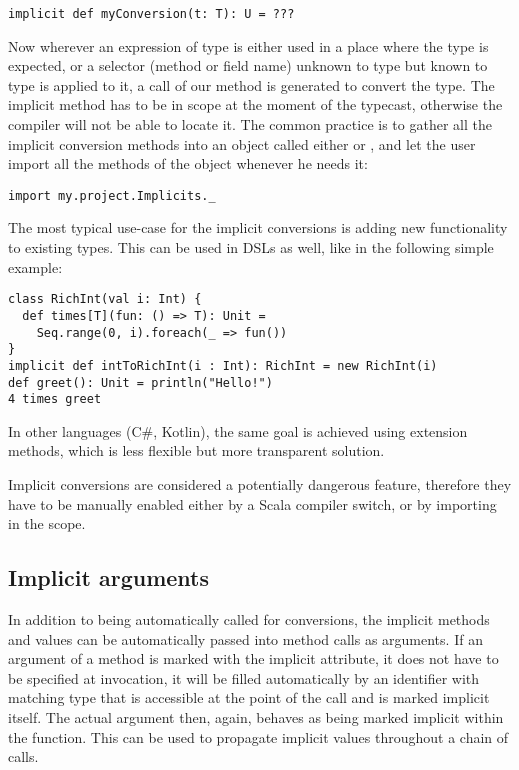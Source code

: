 \lstset{style=Scala}
\begin{lstlisting}
implicit def myConversion(t: T): U = ???
\end{lstlisting}

Now wherever an expression of type  is either used in a place where the type  is expected, or a selector (method or field name) unknown to type  but known to type  is applied to it, a call of our  method is generated to convert the type. The implicit method has to be in scope at the moment of the typecast, otherwise the compiler will not be able to locate it. The common practice is to gather all the implicit conversion methods into an object called either  or , and let the user import all the methods of the object whenever he needs it:

\lstset{style=Scala}
\begin{lstlisting}
import my.project.Implicits._
\end{lstlisting}

The most typical use-case for the implicit conversions is adding new functionality to existing types. This can be used in DSLs as well, like in the following simple example:

\lstset{style=Scala}
\begin{lstlisting}
class RichInt(val i: Int) {
  def times[T](fun: () => T): Unit =
    Seq.range(0, i).foreach(_ => fun())
}
implicit def intToRichInt(i : Int): RichInt = new RichInt(i)
def greet(): Unit = println("Hello!")
4 times greet
\end{lstlisting}

In other languages (C\#, Kotlin), the same goal is achieved using extension methods, which is less flexible but more transparent solution.

Implicit conversions are considered a potentially dangerous feature, therefore they have to be manually enabled either by a Scala compiler switch, or by importing  in the scope.

\subsection{Implicit arguments}
\label{subsec:implicit_args}

In addition to being automatically called for conversions, the implicit methods and values can be automatically passed into method calls as arguments. If an argument of a method is marked with the implicit attribute, it does not have to be specified at invocation, it will be filled automatically by an identifier with matching type that is accessible at the point of the call and is marked implicit itself. The actual argument then, again, behaves as being marked implicit within the function. This can be used to propagate implicit values throughout a chain of calls.

